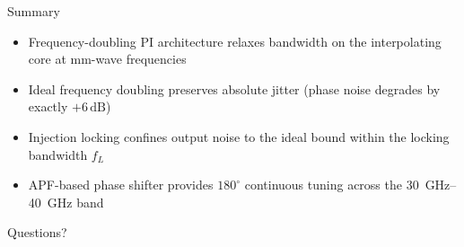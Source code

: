 \documentclass[10pt, aspectratio=169]{beamer}
\begin{document}
\begin{frame}{Summary}
  \begin{itemize}
    \item Frequency-doubling PI architecture relaxes bandwidth on the
          interpolating core at mm-wave frequencies
    \item Ideal frequency doubling preserves absolute jitter
          (phase noise degrades by exactly $+6\,\mathrm{dB}$)
    \item Injection locking confines output noise to the ideal bound
          within the locking bandwidth $f_L$
    \item APF-based phase shifter provides $180^\circ$ continuous tuning
          across the \SIrange{30}{40}{\giga\hertz} band
  \end{itemize}
\end{frame}

\begin{frame}[standout]
  Questions?
\end{frame}
\end{document}
